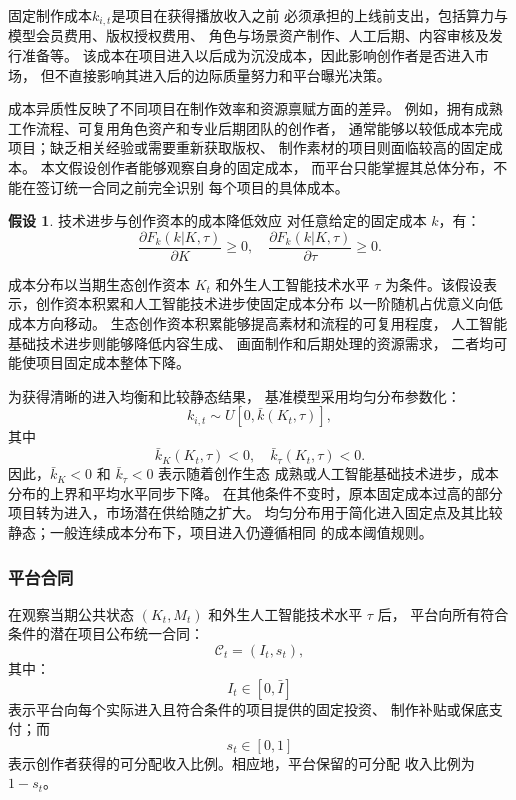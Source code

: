 \documentclass[UTF8, a4paper, 12pt, fontset=fandol]{ctexart}
\theoremstyle{definition}
\newtheorem{assumption}{假设}[section]
\theoremstyle{remark}
\begin{document}
固定制作成本$k_{i,t}$是项目在获得播放收入之前
必须承担的上线前支出，包括算力与模型会员费用、版权授权费用、
角色与场景资产制作、人工后期、内容审核及发行准备等。
该成本在项目进入以后成为沉没成本，因此影响创作者是否进入市场，
但不直接影响其进入后的边际质量努力和平台曝光决策。

成本异质性反映了不同项目在制作效率和资源禀赋方面的差异。
例如，拥有成熟工作流程、可复用角色资产和专业后期团队的创作者，
通常能够以较低成本完成项目；缺乏相关经验或需要重新获取版权、
制作素材的项目则面临较高的固定成本。
本文假设创作者能够观察自身的固定成本，
而平台只能掌握其总体分布，不能在签订统一合同之前完全识别
每个项目的具体成本。

\begin{assumption}{技术进步与创作资本的成本降低效应}
  对任意给定的固定成本 $k$，有：
  \begin{equation*}
    \frac{\partial F_k(k|K,\tau)}{\partial K} \ge 0,
    \quad
    \frac{\partial F_k(k|K,\tau)}{\partial \tau} \ge 0.
    \tag{A2}
  \end{equation*}
\end{assumption}
成本分布以当期生态创作资本 $K_t$ 和外生人工智能技术水平 $\tau$
为条件。该假设表示，创作资本积累和人工智能技术进步使固定成本分布
以一阶随机占优意义向低成本方向移动。
生态创作资本积累能够提高素材和流程的可复用程度，
人工智能基础技术进步则能够降低内容生成、
画面制作和后期处理的资源需求，
二者均可能使项目固定成本整体下降。

为获得清晰的进入均衡和比较静态结果，
基准模型采用均匀分布参数化：
\begin{equation*}
  k_{i,t} \sim U[0,\bar k(K_t,\tau)],
\end{equation*}
其中
\begin{equation*}
  \bar k_K(K_t,\tau) < 0, \quad \bar k_\tau(K_t,\tau) < 0.
\end{equation*}
因此，$\bar{k}_K<0$ 和 $\bar{k}_\tau<0$ 表示随着创作生态
成熟或人工智能基础技术进步，成本分布的上界和平均水平同步下降。
在其他条件不变时，原本固定成本过高的部分项目转为进入，市场潜在供给随之扩大。
均匀分布用于简化进入固定点及其比较静态；一般连续成本分布下，项目进入仍遵循相同
的成本阈值规则。
\subsubsection{平台合同}
在观察当期公共状态 $(K_t,M_t)$ 和外生人工智能技术水平 $\tau$ 后，
平台向所有符合条件的潜在项目公布统一合同：
\begin{equation*}
  \mathcal{C}_t = (I_t,s_t),
\end{equation*}
其中：
\begin{equation*}
  I_t \in [0, \bar I]
\end{equation*}
表示平台向每个实际进入且符合条件的项目提供的固定投资、
制作补贴或保底支付；而
\begin{equation*}
  s_t \in [0,1]
\end{equation*}
表示创作者获得的可分配收入比例。相应地，平台保留的可分配
收入比例为 $1-s_t$。
\end{document}
